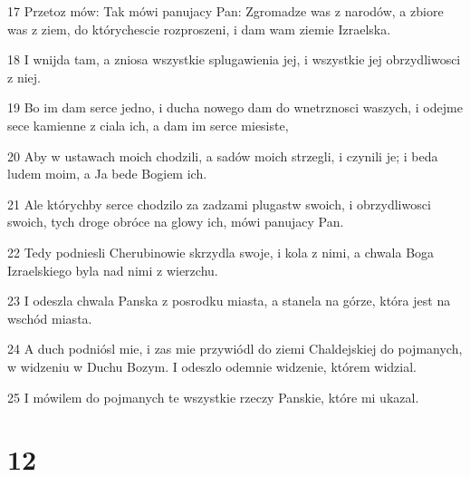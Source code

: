 \par 17 Przetoz mów: Tak mówi panujacy Pan: Zgromadze was z narodów, a zbiore was z ziem, do którychescie rozproszeni, i dam wam ziemie Izraelska.
\par 18 I wnijda tam, a zniosa wszystkie splugawienia jej, i wszystkie jej obrzydliwosci z niej.
\par 19 Bo im dam serce jedno, i ducha nowego dam do wnetrznosci waszych, i odejme sece kamienne z ciala ich, a dam im serce miesiste,
\par 20 Aby w ustawach moich chodzili, a sadów moich strzegli, i czynili je; i beda ludem moim, a Ja bede Bogiem ich.
\par 21 Ale którychby serce chodzilo za zadzami plugastw swoich, i obrzydliwosci swoich, tych droge obróce na glowy ich, mówi panujacy Pan.
\par 22 Tedy podniesli Cherubinowie skrzydla swoje, i kola z nimi, a chwala Boga Izraelskiego byla nad nimi z wierzchu.
\par 23 I odeszla chwala Panska z posrodku miasta, a stanela na górze, która jest na wschód miasta.
\par 24 A duch podniósl mie, i zas mie przywiódl do ziemi Chaldejskiej do pojmanych, w widzeniu w Duchu Bozym. I odeszlo odemnie widzenie, którem widzial.
\par 25 I mówilem do pojmanych te wszystkie rzeczy Panskie, które mi ukazal.

\chapter{12}

